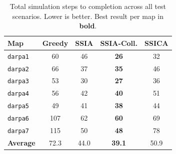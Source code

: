 \documentclass[conference]{IEEEtran}
\begin{document}
\begin{table}[t]
    \centering
    \caption{Total simulation steps to completion across all test scenarios. Lower is better. Best result per map in \textbf{bold}.}
    \label{tab:results}
    \begin{tabular}{@{}lcccc@{}}
        \toprule
        \textbf{Map} & \textbf{Greedy} & \textbf{SSIA} & \textbf{SSIA-Coll.} & \textbf{SSICA} \\
        \midrule
        \texttt{darpa1} & 60  & 46 & \textbf{26} & 32 \\
        \texttt{darpa2} & 66  & 37 & \textbf{35} & 46 \\
        \texttt{darpa3} & 53  & 30 & \textbf{27} & 36 \\
        \texttt{darpa4} & 56  & 42 & \textbf{40} & 51 \\
        \texttt{darpa5} & 49  & 41 & \textbf{38} & 44 \\
        \texttt{darpa6} & 107 & 62 & \textbf{60} & 69 \\
        \texttt{darpa7} & 115 & 50 & \textbf{48} & 78 \\
        \midrule
        \textbf{Average} & 72.3 & 44.0 & \textbf{39.1} & 50.9 \\
        \bottomrule
    \end{tabular}
\end{table}
\end{document}
